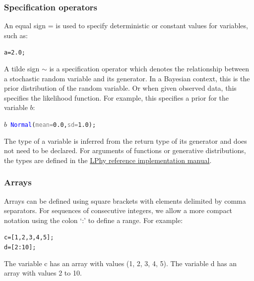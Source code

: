 \documentclass[10pt,letterpaper,table]{article}
\theoremstyle{definition}
\begin{document}
\subsubsection{Specification operators}
An equal sign = is used to specify deterministic or constant values for variables, such as: 
{
  \small
  \begin{listing}
    \begin{alltt}
    a = \textcolor{constant}{2.0};
    \end{alltt}
  \end{listing}
}
\noindent A tilde sign $\sim$ is a specification operator which denotes the relationship between a stochastic random variable and its generator. 
In a Bayesian context, this is the prior distribution of the random variable. 
Or when given observed data, this specifies the likelihood function. 
For example, this specifies a prior for the variable $b$:  
{
  \small
  \begin{listing}
    \begin{alltt}
    \textcolor{bluishgreen}{\(b\)} ~ \textcolor{blue}{Normal}(\textcolor{gray}{mean=}\textcolor{constant}{0.0}, \textcolor{gray}{sd=}\textcolor{constant}{1.0});
    \end{alltt}
  \end{listing}
}

The type of a variable is inferred from the return type of its generator and does not need to be declared. 
For arguments of functions or generative distributions, the types are defined in the  \href{https://github.com/LinguaPhylo/linguaPhylo/blob/1.4.1-docs/lphy/doc/index.md}{LPhy reference implementation manual}. 

\subsubsection{Arrays}
Arrays can be defined using square brackets with elements delimited by comma separators. 
For sequences of consecutive integers, we allow a more compact notation using the colon `:' to define a range.
For example:  
{
  \small
  \begin{listing}
    \begin{alltt}
    c =[\textcolor{constant}{1}, \textcolor{constant}{2}, \textcolor{constant}{3}, \textcolor{constant}{4}, \textcolor{constant}{5}];
    d =[\textcolor{constant}{2}:\textcolor{constant}{10}];
    \end{alltt}
  \end{listing}
}
\noindent The variable c has an array with values (1, 2, 3, 4, 5). 
The variable d has an array with values 2 to 10.
\end{document}
